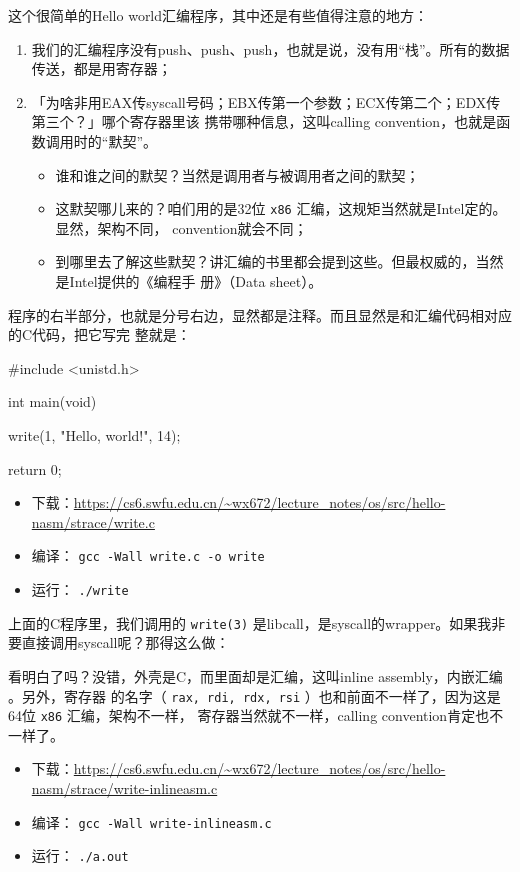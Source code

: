 \documentclass{wx672ctexart}
\newcommand\mpic[1]{%
  \marginpar{\texttt{[image: thumbnails/\#1]}}}
\begin{document}
这个很简单的Hello world汇编程序，其中还是有些值得注意的地方：
\begin{enumerate}
\item 我们的汇编程序没有push、push、push，也就是说，没有用“栈”。所有的数据传送，都是用寄存器；
\item 「为啥非用EAX传syscall号码；EBX传第一个参数；ECX传第二个；EDX传第三个？」哪个寄存器里该
携带哪种信息，这叫calling convention，也就是函数调用时的“默契”。
\begin{itemize}
\item 谁和谁之间的默契？当然是调用者与被调用者之间的默契；
\item 这默契哪儿来的？咱们用的是32位 \texttt{x86} 汇编，这规矩当然就是Intel定的。显然，架构不同，
convention就会不同；
\item 到哪里去了解这些默契？讲汇编的书里都会提到这些。但最权威的，当然是Intel提供的《编程手
册》（Data sheet）。
\end{itemize}
\end{enumerate}

程序的右半部分，也就是分号右边，显然都是注释。而且显然是和汇编代码相对应的C代码，把它写完
整就是：
\begin{ccode}
#include <unistd.h>

int main(void)
{
  write(1, "Hello, world!\n", 14);

  return 0;
}
\end{ccode}
\begin{itemize}
\item 下载：\url{https://cs6.swfu.edu.cn/\~wx672/lecture\_notes/os/src/hello-nasm/strace/write.c}
\item 编译： \texttt{gcc -Wall write.c -o write}
\item 运行： \texttt{./write}
\end{itemize}

上面的C程序里，我们调用的 \texttt{write(3)} 是libcall，是syscall的wrapper。如果我非
要直接调用syscall呢？那得这么做：
看明白了吗？没错，外壳是C，而里面却是汇编，这叫inline assembly，内嵌汇编\mpic{pg_0044}。另外，寄存器
的名字（ \texttt{rax, rdi, rdx, rsi} ）也和前面不一样了，因为这是64位 \texttt{x86} 汇编，架构不一样，
寄存器当然就不一样，calling convention肯定也不一样了。
\begin{itemize}
\item 下载：\url{https://cs6.swfu.edu.cn/\~wx672/lecture\_notes/os/src/hello-nasm/strace/write-inlineasm.c}
\item 编译： \texttt{gcc -Wall write-inlineasm.c}
\item 运行： \texttt{./a.out}
\end{itemize}
\end{document}
